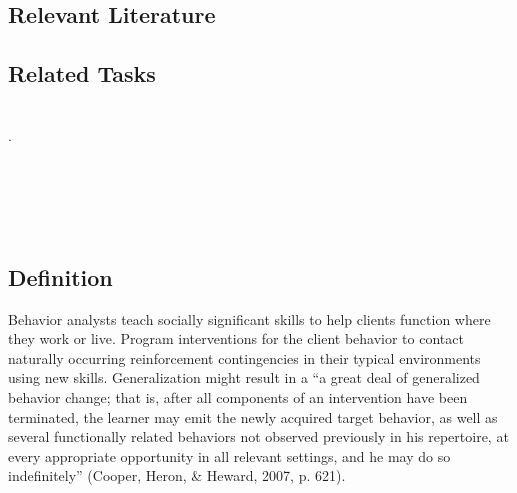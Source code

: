 \subsection{Relevant Literature}
\begin{refsection}
\nocite{test,alang2017police,clayton2018black}
\printbibliography[heading=none]
\end{refsection}
%
\subsection{Related Tasks}
\fourdTwo{}\\.
\fourdEighteen{}\\
\fourdNineteen{}\\
\fouriSix{}\\
\fourjSix{}\\
\fourjSeven{}\\
%
%
%
%
%
%
%
%
%
%
\section[\fourjEleven{}]{\fourjEleven{}%
            }
\subsection{Definition}
Behavior analysts teach socially significant skills to help clients function where they work or live. Program interventions for the client behavior to contact naturally occurring reinforcement contingencies in their typical environments using new skills. Generalization might result in a ``a great deal of generalized behavior change; that is, after all components of an intervention have been terminated, the learner may emit the newly acquired target behavior, as well as several functionally related behaviors not observed previously in his repertoire, at every appropriate opportunity in all relevant settings, and he may do so indefinitely'' (Cooper, Heron, \& Heward, 2007, p. 621).

